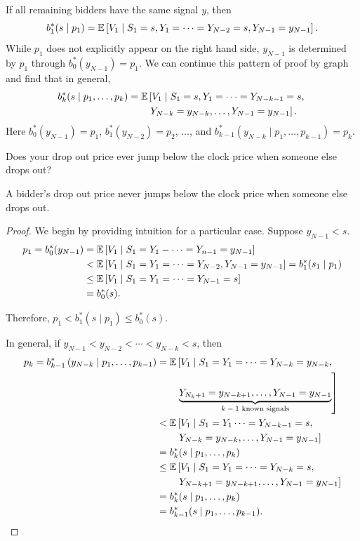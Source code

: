 If all remaining bidders have the same signal $y$, then \[
	b_1^*(s \mid p_1) = \mathbb{E}\left[V_1 \mid S_1 = s, Y_1 = \cdots = Y_{N-2} = s, Y_{N-1} = y_{N-1}\right] 
.\] While $p_1$ does not explicitly appear on the right hand side, $y_{N-1}$ is determined by $p_1$ through $b_0^*(y_{N-1}) = p_1$. We can continue this pattern of proof by graph and find that in general,
\[
	\begin{aligned}
		b_k^*(s\mid p_1,\ldots,p_k)
		&= \mathbb{E}\left[V_1 \mid S_1=  s, Y_1 = \cdots = Y_{N-k-1} = s,\right. \\
		&\qquad \left.Y_{N-k} = y_{N-k}, \ldots,Y_{N-1} = y_{N-1}\right].
	\end{aligned}
\]
Here $b_0^*(y_{N-1}) = p_1$, $b_1^*(y_{N-2}) = p_2$, $\ldots$, and $b_{k-1}^*(y_{N-k} \mid p_1,\ldots,p_{k-1}) = p_k$.

Does your drop out price ever jump below the clock price when someone else drops out?
\begin{proposition}	A bidder's drop out price never jumps below the clock price when someone else drops out.
\end{proposition}
\begin{proof}
	We begin by providing intuition for a particular case. Suppose $y_{N-1} < s$.
	\begin{align*}
		p_1 = b_0^*(y_{N-1}) &= \mathbb{E}\left[V_1 \mid S_1 = Y_1 - \cdots = Y_{n-1} = y_{N-1}\right] \\
							 &< \mathbb{E}\left[V_1 \mid S_1 = Y_1 = \cdots = Y_{N-2}, Y_{N-1} = y_{N-1} \right] = b_1^*(s_1 \mid p_1) \\
							 &\le \mathbb{E}\left[V_1 \mid S_1=Y_1 =\cdots = Y_{N-1} = s\right] \\
							 &= b_0^*(s)
	.\end{align*}

	Therefore, $p_1 < b_1^*(s \mid p_1) \le b_0^*(s)$.

		In general, if $y_{N-1} < y_{N-2} < \cdots < y_{N-k} < s$, then
		\begin{align*}
			p_k = b_{k-1}^*\left( y_{N-k} \mid p_1,\ldots,p_{k-1} \right)
			&= \mathbb{E}\left[V_1 \mid S_1 = Y_1 = \cdots = Y_{N-k} = y_{N-k},\right. \\
			&\qquad \left.\underbrace{Y_{N_k+1} = y_{N-k+1}, \ldots, Y_{N-1} = y_{N-1}}_{\text{$k-1$ known signals}}\right]  \\
			&< \mathbb{E}\left[V_1 \mid S_1 = Y_1 \cdots  = Y_{N-k-1} = s,\right. \\
			&\qquad \left.Y_{N-k} = y_{N-k}, \ldots,Y_{N-1} = y_{N-1}\right]  \\
			&= b_k^*(s \mid p_1,\ldots,p_k) \\
			&\le \mathbb{E}\left[V_1 \mid S_1 = Y_1 =\cdots= Y_{N-k} = s,\right. \\
			&\qquad \left.Y_{N-k+1}= y_{N-k+1}, \ldots,Y_{N-1} = y_{N-1}\right] \\
			&= b_k^{*}(s \mid p_1,\ldots,p_k) \\
			&= b_{k-1}^*(s \mid p_1,\ldots,p_{k-1})
		.\end{align*} 
\end{proof}

